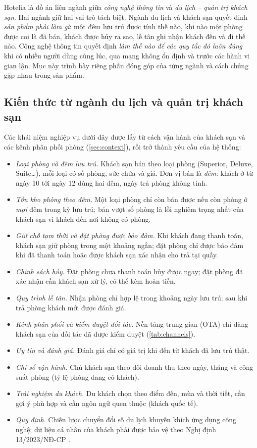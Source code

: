 Hotelia là đồ án liên ngành giữa \emph{công nghệ thông tin} và \emph{du lịch -- quản trị khách sạn}. Hai ngành giữ hai vai trò tách biệt. Ngành du lịch và khách sạn quyết định \emph{sản phẩm phải làm gì}: một đêm lưu trú được tính thế nào, khi nào một phòng được coi là đã bán, khách được hủy ra sao, lễ tân ghi nhận khách đến và đi thế nào. Công nghệ thông tin quyết định \emph{làm thế nào để các quy tắc đó luôn đúng} khi có nhiều người dùng cùng lúc, qua mạng không ổn định và trước các hành vi gian lận. Mục này trình bày riêng phần đóng góp của từng ngành và cách chúng gặp nhau trong sản phẩm.

\subsection{Kiến thức từ ngành du lịch và quản trị khách sạn}

Các khái niệm nghiệp vụ dưới đây được lấy từ cách vận hành của khách sạn và các kênh phân phối phòng (\cref{sec:context}), rồi trở thành yêu cầu của hệ thống:

\begin{itemize}
\item \emph{Loại phòng và đêm lưu trú.} Khách sạn bán theo loại phòng (Superior, Deluxe, Suite\ldots), mỗi loại có số phòng, sức chứa và giá. Đơn vị bán là \emph{đêm}: khách ở từ ngày 10 tới ngày 12 dùng hai đêm, ngày trả phòng không tính.
\item \emph{Tồn kho phòng theo đêm.} Một loại phòng chỉ còn bán được nếu còn phòng ở \emph{mọi} đêm trong kỳ lưu trú; bán vượt số phòng là lỗi nghiêm trọng nhất của khách sạn vì khách đến nơi không có phòng.
\item \emph{Giữ chỗ tạm thời và đặt phòng được bảo đảm.} Khi khách đang thanh toán, khách sạn giữ phòng trong một khoảng ngắn; đặt phòng chỉ được bảo đảm khi đã thanh toán hoặc được khách sạn xác nhận cho trả tại quầy.
\item \emph{Chính sách hủy.} Đặt phòng chưa thanh toán hủy được ngay; đặt phòng đã xác nhận cần khách sạn xử lý, có thể kèm hoàn tiền.
\item \emph{Quy trình lễ tân.} Nhận phòng chỉ hợp lệ trong khoảng ngày lưu trú; sau khi trả phòng khách mới được đánh giá.
\item \emph{Kênh phân phối và kiểm duyệt đối tác.} Nền tảng trung gian (OTA) chỉ đăng khách sạn của đối tác đã được kiểm duyệt (\cref{tab:channels}).
\item \emph{Uy tín và đánh giá.} Đánh giá chỉ có giá trị khi đến từ khách đã lưu trú thật.
\item \emph{Chỉ số vận hành.} Chủ khách sạn theo dõi doanh thu theo ngày, tháng và công suất phòng (tỷ lệ phòng đang có khách).
\item \emph{Trải nghiệm du khách.} Du khách chọn theo điểm đến, mùa và thời tiết, cần gợi ý phù hợp và cần ngôn ngữ quen thuộc (khách quốc tế).
\item \emph{Quy định.} Chiến lược chuyển đổi số du lịch \cite{qd147,qd1671} khuyến khích ứng dụng công nghệ; dữ liệu cá nhân của khách phải được bảo vệ theo Nghị định 13/2023/NĐ-CP \cite{nd13}.
\end{itemize}

